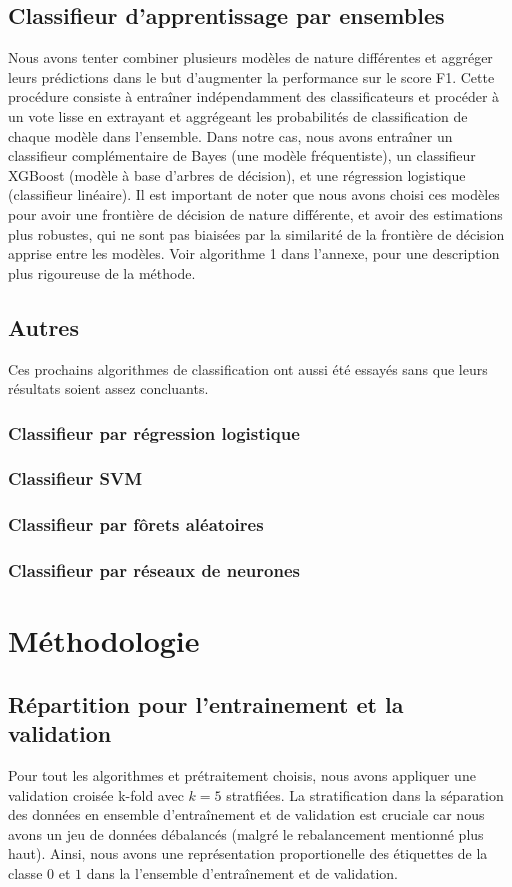 \documentclass{article}
\begin{document}
\subsection{Classifieur d'apprentissage par ensembles}
Nous avons tenter combiner plusieurs modèles de nature différentes et aggréger leurs prédictions dans le but d'augmenter la performance sur le score F1. Cette procédure consiste à entraîner indépendamment des classificateurs et procéder à un vote lisse en extrayant et aggrégeant les probabilités de classification de chaque modèle dans l'ensemble. Dans notre cas, nous avons entraîner un classifieur complémentaire de Bayes (une modèle fréquentiste), un classifieur XGBoost (modèle à base d'arbres de décision), et une régression logistique (classifieur linéaire). Il est important de noter que nous avons choisi ces modèles pour avoir une frontière de décision de nature différente, et avoir des estimations plus robustes, qui ne sont pas biaisées par la similarité de la frontière de décision apprise entre les modèles. Voir algorithme 1 dans l'annexe, pour une description plus rigoureuse de la méthode.

\subsection{Autres}
Ces prochains algorithmes de classification ont aussi été essayés sans que leurs résultats soient assez concluants.
\subsubsection{Classifieur par régression logistique}
\subsubsection{Classifieur SVM}
\subsubsection{Classifieur par fôrets aléatoires}
\subsubsection{Classifieur par réseaux de neurones}

\section{Méthodologie}
\subsection{Répartition pour l'entrainement et la validation}
Pour tout les algorithmes et prétraitement choisis, nous avons appliquer une validation croisée k-fold avec $k = 5$ stratfiées. La stratification dans la séparation des données en ensemble d'entraînement et de validation est cruciale car nous avons un jeu de données débalancés (malgré le rebalancement mentionné plus haut). Ainsi, nous avons une représentation proportionelle des étiquettes de la classe $0$ et $1$ dans la l'ensemble d'entraînement et de validation. 
\end{document}
